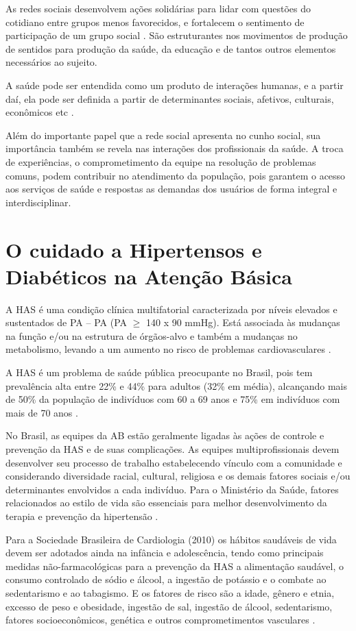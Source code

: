 As redes sociais desenvolvem ações solidárias para lidar com questões do cotidiano entre grupos menos favorecidos, e fortalecem o sentimento de participação de um grupo social \cite{de2002apoio}. São estruturantes nos movimentos de produção de sentidos para produção da saúde, da educação e de tantos outros elementos necessários ao sujeito.

A saúde pode ser entendida como um produto de interações humanas, e a partir daí, ela pode ser definida a partir de determinantes sociais, afetivos, culturais, econômicos etc \cite{martins2004redes}.

Além do importante papel que a rede social apresenta no cunho social, sua importância também se revela nas interações dos profissionais da saúde.  A troca de experiências, o comprometimento da equipe na resolução de problemas comuns, podem contribuir no atendimento da população, pois garantem o acesso aos serviços de saúde e respostas as demandas dos usuários de forma integral e interdisciplinar.

\section{O cuidado a Hipertensos e Diabéticos na Atenção Básica}
A \acrlong{HAS} é uma condição clínica multifatorial caracterizada por níveis elevados e sustentados de \acrlong{PA} – PA (PA $\geq$ 140 x 90 mmHg). Está associada às mudanças na função e/ou na estrutura de órgãos-alvo e também a mudanças no metabolismo, levando a um aumento no risco de problemas cardiovasculares \cite{hipertenso}.

A HAS é um problema de saúde pública preocupante no Brasil, pois tem prevalência alta entre 22\% e 44\% para adultos (32\% em média), alcançando mais de 50\% da população de indivíduos com 60 a 69 anos e 75\% em indivíduos com mais de 70 anos \cite{hipertenso}.

No Brasil, as equipes da AB estão geralmente ligadas às ações de controle e prevenção da HAS e de suas complicações. As equipes multiprofissionais devem desenvolver seu processo de trabalho estabelecendo vínculo com a comunidade e considerando diversidade racial, cultural, religiosa e os demais fatores sociais e/ou determinantes envolvidos a cada indivíduo. Para o Ministério da Saúde, fatores relacionados ao estilo de vida são essenciais para melhor desenvolvimento da terapia e prevenção da hipertensão \cite{atencaobasica37}.

Para a Sociedade Brasileira de Cardiologia (2010) os hábitos saudáveis de vida devem ser adotados ainda na infância e adolescência, tendo como principais medidas não-farmacológicas para a prevenção da HAS a alimentação saudável, o consumo controlado de sódio e álcool, a ingestão de potássio e o combate ao sedentarismo e ao tabagismo. E os fatores de risco são a idade, gênero e etnia, excesso de peso e obesidade, ingestão de sal, ingestão de álcool, sedentarismo, fatores socioeconômicos, genética e outros comprometimentos vasculares \cite{hipertenso}.

